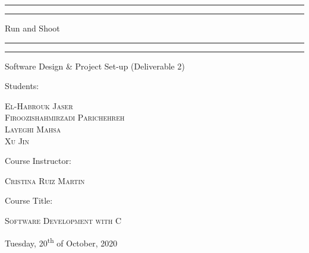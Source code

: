\documentclass[a4paper, 11pt, oneside]{article}
\begin{document}
 
\begin{titlepage} 
\centering
\scshape
\vspace*{\baselineskip}
\rule{\textwidth}{1.6pt}\vspace*{-\baselineskip}\vspace*{2pt} 
\rule{\textwidth}{0.4pt} 
\vspace{0.75\baselineskip} 

{\LARGE Run and Shoot}

\vspace{0.75\baselineskip} 
\rule{\textwidth}{0.4pt}\vspace*{-\baselineskip}\vspace{3.2pt}
\rule{\textwidth}{1.6pt}
\vspace{2\baselineskip}

	Software Design \& Project Set-up (Deliverable 2) %
	
	\vspace*{3\baselineskip} %
	
	
	Students:
	
	\vspace{0.5\baselineskip} %
	
	{\scshape\Large El-Habrouk Jaser \\ Firoozishahmirzadi Parichehreh \\ Layeghi Mahsa \\ Xu Jin} 
	
	\vspace{3\baselineskip} 
	
	
		
	Course Instructor:
	
	\vspace{0.5\baselineskip} %
	
	{\scshape\Large Cristina Ruiz Martin}
	
	\vspace{3\baselineskip} %
	
	Course Title:
	\vspace{0.5\baselineskip} %
	
	{\scshape\Large Software Development with C} 
	
	\vfill %
	
	
	\vspace{0.3\baselineskip} %
	
	Tuesday, 20\textsuperscript{th} of October, 2020 %
\end{titlepage}





\end{document}
